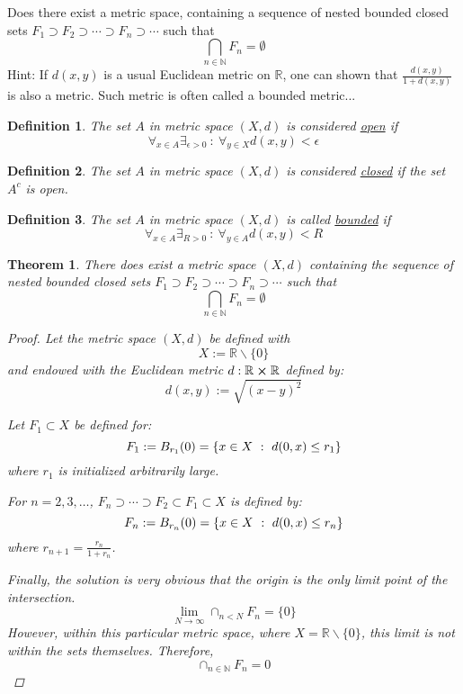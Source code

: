\documentclass[]{article}
\newcommand{\R}{\mathbb{R}}
\newcommand{\N}{\mathbb{N}}
\newcommand{\st}{\ : \ }
\newtheorem{definition}{Definition}
\newtheorem{theorem}{Theorem}
\begin{document}
\newpage
\section{}
Does there exist a metric space, containing a sequence of nested bounded closed sets 
$F_1 \supset F_2 \supset \cdots \supset F_n \supset \cdots$
such that
\[
    \bigcap_{n \in \N} F_n = \emptyset
\]
Hint: If $d(x,y)$ is a usual Euclidean metric on $\R$, 
one can shown that $\frac{d(x,y)}{1 + d(x,y)}$ is also a metric.
Such metric is often called a bounded metric...

\begin{definition}
    The set $A$ in metric space $(X,d)$ is considered \emph{\underline{open}} if 
    \[
        \forall_{x \in A} \exists_{\epsilon > 0} \st \forall_{y \in X} d(x,y)<\epsilon
    \]
\end{definition}

\begin{definition}
    The set $A$ in metric space $(X,d)$ is considered \emph{\underline{closed}} if the set $A^c$ is open.
\end{definition}

\begin{definition}
    The set $A$ in metric space $(X,d)$ is called \emph{\underline{bounded}} if
    \[
        \forall_{x \in A} \exists_{R>0} \st \forall_{y\in A} d(x,y) < R
    \]
\end{definition}

\begin{theorem}
    There does exist a metric space $(X,d)$ 
    containing the sequence of nested bounded closed sets 
    $F_1 \supset F_2 \supset \cdots \supset F_n \supset \cdots$
    such that \[
        \bigcap_{n \in \N} F_n = \emptyset
    \]
    \begin{proof}
        Let the metric space $(X,d)$ be defined with\[
            X := \R \backslash \{0\}
        \]
        and endowed with the Euclidean metric $d : \R \cross \R$ defined by:\[
            d(x,y) := \sqrt{(x-y)^2}
        \]
        
        Let $F_1 \subset X$ be defined for:\[
            F_1 := B_{r_1}(0) = \qty{
                x \in X \st d(0,x) \leq r_1
            }
        \]
        where $r_1$ is initialized arbitrarily large.

        For $n = 2, 3, \dots$, 
        $F_n \supset \cdots \supset F_2 \subset F_1 \subset X$ is defined by:
        \[
           F_n := B_{r_n}(0) = \qty{
               x \in X \st d(0,x) \leq r_n
           }
        \]
        where $r_{n+1} = \frac{r_n}{1+r_n}$.

        Finally, the solution is very obvious that the origin is the only limit point of the intersection.\[
            \lim_{N \to \infty} \cap_{n < N} F_n = \{0\}
        \] 
        However, within this particular metric space, where $X = \R \backslash \{0\}$, this limit is not within the sets themselves.
        Therefore,
        \[
            \cap_{n \in \N} F_n = 0
        \]
    \end{proof}
\end{theorem}
\end{document}
